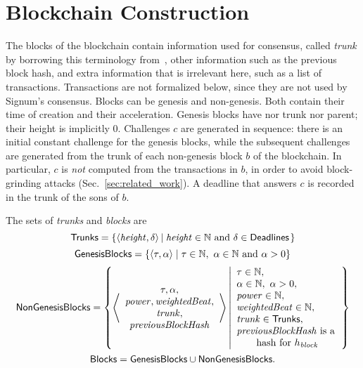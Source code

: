 \section{Blockchain Construction}\label{sec:blockchain_construction}

The blocks of the blockchain contain information used for consensus,
called \emph{trunk} by borrowing this terminology from~\cite{CohenP19},
other information such as the previous block hash,
and extra information that is irrelevant here, such as a list of transactions.
Transactions are not formalized below, since they are not used by Signum's consensus.
Blocks can be genesis and non-genesis. Both contain their time of creation and their acceleration.
Genesis blocks have nor trunk nor parent; their height is implicitly $0$.
Challenges $c$ are generated in sequence: there is an initial constant challenge for the genesis
blocks, while the subsequent challenges are generated from the trunk of
each non-genesis block $b$ of the blockchain.
In particular, $c$ is \emph{not} computed from the transactions in $b$,
in order to avoid block-grinding attacks (Sec.~\ref{sec:related_work}).
A deadline that answers $c$ is recorded in the trunk of the sons of $b$.
%
\begin{definition}\label{def:trunk}
  The sets of \emph{trunks} and \emph{blocks} are
  \[
  {\mathsf{Trunks}}=\left\{\langle{\mathit{height}},\delta\rangle\left|\;{\mathit{height}}\in\mathbb{N}\text{ and }\delta\in{\mathsf{Deadlines}}\right.\right\}
  \]
  \[
  \GenesisBlocks=\left\{\langle\tau,\alpha\rangle\mid\tau\in\mathbb{N},\ \alpha\in\mathbb{N}\text{ and }\alpha>0\right\}
  \]
  \[
  {\mathsf{NonGenesisBlocks}}=\left\{\left\langle\begin{array}{c}
  \tau,\alpha,\\
  {\mathit{power}},\mathit{weightedBeat},\\
  {\mathit{trunk}},\\
  {\mathit{previousBlockHash}}
  \end{array}\right\rangle\left|\begin{array}{l}
  \tau\in\mathbb{N},\\
  \alpha\in\mathbb{N},\ \alpha>0,\\
  {\mathit{power}}\in\mathbb{N},\\
  \mathit{weightedBeat}\in\mathbb{N},\\
  {\mathit{trunk}}\in{\mathsf{Trunks}},\\
  {\mathit{previousBlockHash}}\text{ is a}\\
  \qquad\text{hash for $h_{\mathit{block}}$}
  \end{array}\right.\right\}
  \]
  \[
  {\mathsf{Blocks}}={\mathsf{GenesisBlocks}}\cup{\mathsf{NonGenesisBlocks}}.
  \]
\end{definition}
